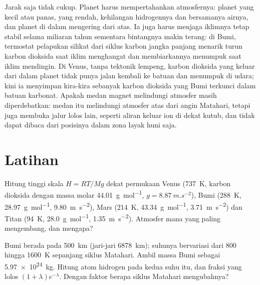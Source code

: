 Jarak saja tidak cukup. Planet harus mempertahankan atmosfernya: planet yang kecil
atau panas, yang  rendah, kehilangan hidrogennya dan bersamanya
airnya, dan planet di dalam  mengering dari atas. Ia
juga harus menjaga iklimnya tetap stabil selama miliaran tahun sementara bintangnya
makin terang: di Bumi, termostat pelapukan silikat dari
siklus karbon jangka panjang menarik turun karbon dioksida saat iklim menghangat
dan membiarkannya menumpuk saat iklim mendingin. Di Venus, tanpa tektonik lempeng,
karbon dioksida yang keluar dari dalam planet tidak punya jalan kembali ke batuan dan
menumpuk di udara; kini ia menyimpan kira-kira sebanyak karbon dioksida yang
Bumi terkunci dalam batuan karbonat. Apakah medan magnet melindungi
atmosfer masih diperdebatkan: medan itu melindungi atmosfer atas dari angin
Matahari, tetapi juga membuka jalur lolos lain, seperti aliran keluar ion
di dekat kutub, dan  tidak dapat dibaca dari
posisinya dalam zona layak huni saja.

\section{Latihan}

\begin{exercise}[$\star$]\label{exo:b3:planetary-atmospheres:1}
Hitung tinggi skala $H = RT/Mg$ dekat permukaan Venus
(\qty{737}{K}, karbon dioksida dengan massa molar \qty{44.01}{g.mol^{-1}},
$g = \qty{8.87}{m.s^{-2}}$), Bumi (\qty{288}{K},
\qty{28.97}{g.mol^{-1}}, \qty{9.80}{m.s^{-2}}), Mars (\qty{214}{K},
\qty{43.34}{g.mol^{-1}}, \qty{3.71}{m.s^{-2}}) dan Titan (\qty{94}{K},
\qty{28.0}{g.mol^{-1}}, \qty{1.35}{m.s^{-2}}). Atmosfer mana yang paling
mengembang, dan mengapa?
\end{exercise}

\begin{exercise}[$\star$]\label{exo:b3:planetary-atmospheres:2}
 Bumi berada pada \qty{500}{km} (jari-jari \qty{6878}{km});
suhunya bervariasi dari 800 hingga \qty{1600}{K} sepanjang siklus Matahari.
Ambil massa Bumi sebagai \qty{5.97e24}{kg}. Hitung 
atom hidrogen pada kedua suhu itu, dan fraksi yang lolos
$(1 + \lambda)e^{-\lambda}$. Dengan faktor berapa siklus Matahari mengubahnya?
\end{exercise}

